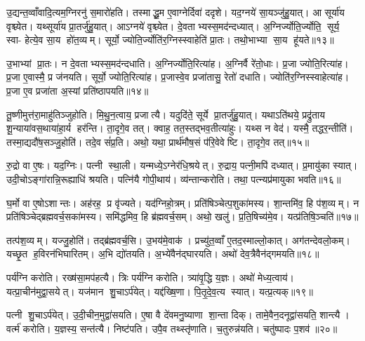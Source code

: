 उ॒द्यन्त॒व्वाँवादि॒त्यम॒ग्निरनु॑ स॒मारो॑हति। तस्माद्धू॒म ए॒वाग्नेर्दिवा॑ ददृशे। यद॒ग्नये॑ सा॒यञ्जु॑हु॒यात्। आ सूर्या॑य वृश्च्येत। यथ्सूर्या॑य प्रा॒तर्जु॑हु॒यात्। आऽग्नये॑ वृश्च्येत। दे॒वताभ्यस्स॒मद॑न्दध्यात्। अ॒ग्निर्ज्योति॒र्ज्योति॒ सूर्य॒ स्वा- हेत्ये॒व सा॒य हो॑त॒व्यम्। सूर्यो॒ ज्योति॒र्ज्योति॑र॒ग्निस्स्वाहेति॑ प्रा॒तः। तथो॒भाभ्या सा॒य हू॑यते॥१३॥

उ॒भाभ्यां प्रा॒तः। न दे॒वताभ्यस्स॒मद॑न्दधाति। अ॒ग्निर्ज्योति॒रित्या॑ह। अ॒ग्निर्वै रे॑तो॒धाः। प्र॒जा ज्योति॒रित्या॑ह। प्र॒जा ए॒वास्मै॒ प्र ज॑नयति। सूर्यो॒ ज्योति॒रित्या॑ह। प्र॒जास्वे॒व प्रजा॑तासु॒ रेतो॑ दधाति। ज्योति॑र॒ग्निस्स्वाहेत्या॑ह। प्र॒जा ए॒व प्रजा॑ता अ॒स्यां प्रति॑ष्ठापयति॥१४॥

तू॒ष्णीमुत्त॑रा॒माहु॑तिञ्जुहोति। मि॒थु॒न॒त्वाय॒ प्रजात्यै। यदुदि॑ते॒ सूर्ये प्रा॒तर्जु॑हु॒यात्। यथाऽति॑थये॒ प्रद्रु॑ताय शू॒न्याया॑वस॒थाया॑हा॒र्य हर॑न्ति। ता॒दृगे॒व तत्। क्वाह॒ तत॒स्तद्भव॒तीत्या॑हुः। यथ्स न वेद॑। यस्मै॒ तद्धर॒न्तीति॑। तस्मा॒द्यदौ॑ष॒सञ्जु॒होति॑। तदे॒व सं॑प्र॒ति। अथो॒ यथा॒ प्रार्थ॑मौष॒सं प॑रि॒वेवेष्टि। ता॒दृगे॒व तत्॥१५॥\anuvakamend[अ॒मृ॒ष्ट॒ वि॒चि॒किथ्स॑ति॒ जुह्व॑त्य॒जाम॑सृजताग्निहो॒त्र सूर्या॑य प्रा॒तर्जु॒होति॒ जुह्व॑ति सं॒पद्ये॑ते हूयते स्थापयति संप्र॒ति द्वे च॑]

रु॒द्रो वा ए॒षः। यद॒ग्निः। पत्नी स्था॒ली। यन्मध्ये॒ऽग्नेर॑धि॒श्रयेत्। रु॒द्राय॒ पत्नी॒मपि॑ दध्यात्। प्र॒मायु॑का स्यात्। उदी॒चोऽङ्गा॑रान्नि॒रूह्याधि॑ श्रयति। पत्नि॑यै गोपी॒थाय॑। व्य॑न्तान्करोति। तथा॒ पत्न्यप्र॑मायुका भवति॥१६॥

घ॒र्मो वा ए॒षोऽशान्तः। अह॑रह॒ प्र वृ॑ज्यते। यद॑ग्निहो॒त्रम्। प्रति॑षिञ्चेत्प॒शुका॑मस्य। शा॒न्तमि॑व॒ हि प॑श॒व्यम्। न प्रति॑षिञ्चेद्ब्रह्मवर्च॒सका॑मस्य। समि॑द्धमिव॒ हि ब्र॑ह्मवर्च॒सम्। अथो॒ खलु॑। प्र॒ति॒षिच्य॑मे॒व। यत्प्र॑तिषि॒ञ्चति॑॥१७॥

तत्प॑श॒व्यम्। यज्जु॒होति॑। तद्ब्र॑ह्मवर्च॒सि। उ॒भय॑मे॒वाक॑। प्रच्यु॑त॒व्वाँ ए॒तद॒स्माल्लो॒कात्। अग॑तन्देवलो॒कम्। यच्छृ॒त ह॒विरन॑भिघारितम्। अ॒भि द्यो॑तयति। अ॒भ्ये॑वैन॑द्घारयति। अथो॑ देव॒त्रैवैन॑द्गमयति॥१८॥

पर्य॑ग्नि करोति। रख्ष॑सा॒मप॑हत्यै। त्रिः पर्य॑ग्नि करोति। त्र्या॑वृ॒द्धि य॒ज्ञः। अथो॑ मेध्य॒त्वाय॑। यत्प्रा॒चीन॑मुद्वा॒सयेत्। यज॑मान शु॒चाऽर्प॑येत्। यद्द॑ख्षि॒णा। पि॒तृ॒दे॒व॒त्य स्यात्। यत्प्र॒त्यक्॥१९॥

पत्नी शु॒चाऽर्प॑येत्। उ॒दी॒चीन॒मुद्वा॑सयति। ए॒षा वै दे॑वमनु॒ष्याणा शा॒न्ता दिक्। तामे॒वैन॒दनूद्वा॑सयति॒ शान्त्यै। वर्त्म॑ करोति। य॒ज्ञस्य॒ सन्त॑त्यै। निष्ट॑पति। उपै॒व तथ्स्तृ॑णाति। च॒तुरुन्न॑यति। चतु॑ष्पादः प॒शव॑॥२०॥

